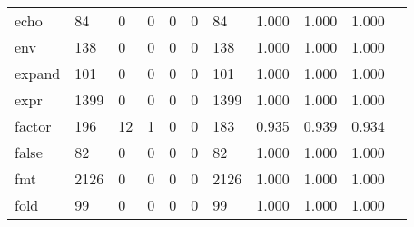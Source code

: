 \begin{longtable}{lp{1.10cm}p{1.10cm}p{1.10cm}p{1.10cm}p{1.10cm}p{1.10cm}p{1.10cm}p{1.10cm}p{1.10cm}p{1.10cm}}
echo      &                     84 &                                  0 &                                 0 &                                0 &                                 0 &                              84 &                          1.000 &                                 1.000 &                               1.000 \\
env       &                    138 &                                  0 &                                 0 &                                0 &                                 0 &                             138 &                          1.000 &                                 1.000 &                               1.000 \\
expand    &                    101 &                                  0 &                                 0 &                                0 &                                 0 &                             101 &                          1.000 &                                 1.000 &                               1.000 \\
expr      &                   1399 &                                  0 &                                 0 &                                0 &                                 0 &                            1399 &                          1.000 &                                 1.000 &                               1.000 \\
factor    &                    196 &                                 12 &                                 1 &                                0 &                                 0 &                             183 &                          0.935 &                                 0.939 &                               0.934 \\
false     &                     82 &                                  0 &                                 0 &                                0 &                                 0 &                              82 &                          1.000 &                                 1.000 &                               1.000 \\
fmt       &                   2126 &                                  0 &                                 0 &                                0 &                                 0 &                            2126 &                          1.000 &                                 1.000 &                               1.000 \\
fold      &                     99 &                                  0 &                                 0 &                                0 &                                 0 &                              99 &                          1.000 &                                 1.000 &                               1.000 \\

\end{longtable}

